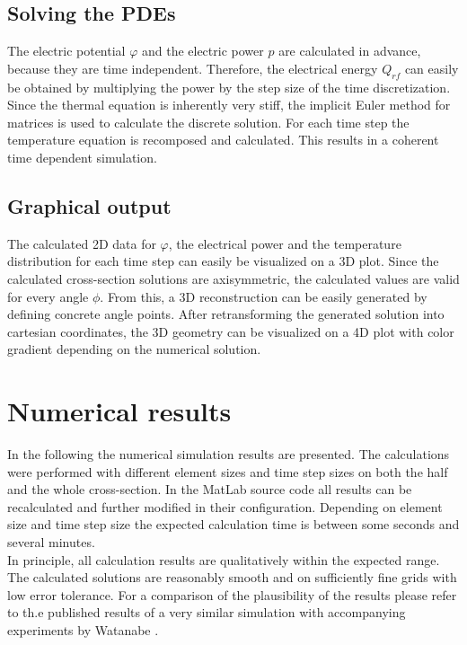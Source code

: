 \documentclass[parskip=half, titlepage=yes, 12pt, BCOR=12mm, DIV=calc]{scrartcl}
\begin{document}
\subsection{Solving the PDEs}
The electric potential $\varphi$ and the electric power $p$ are calculated in advance, because they are time independent. Therefore, the electrical energy $Q_{rf}$ can easily be obtained by multiplying the power by the step size of the time discretization. Since the thermal equation is inherently very stiff, the implicit Euler method for matrices is used to calculate the discrete solution. For each time step the temperature equation is recomposed and calculated. This results in a coherent time dependent simulation.


\subsection{Graphical output}
The calculated 2D data for $\varphi$, the electrical power and the temperature distribution for each time step can easily be visualized on a 3D plot. Since the calculated cross-section solutions are axisymmetric, the calculated values are valid for every angle $\phi$. From this, a 3D reconstruction can be easily generated by defining concrete angle points. After retransforming the generated solution into cartesian coordinates, the 3D geometry can be visualized on a 4D plot with color gradient depending on the numerical solution.

\newpage


\section{Numerical results}

In the following the numerical simulation results are presented. The calculations were performed with different element sizes and time step sizes on both the half and the whole cross-section. In the MatLab source code all results can be recalculated and further modified in their configuration. Depending on element size and time step size the expected calculation time is between some seconds and several minutes. \\

In principle, all calculation results are qualitatively within the expected range. The calculated solutions are reasonably smooth and on sufficiently fine grids with low error tolerance. For a comparison of the plausibility of the results please refer to th.e published results of a very similar simulation with accompanying experiments by Watanabe \cite{watanabe}.
\end{document}
